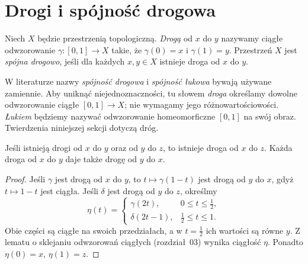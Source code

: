 \section{Drogi i spójność drogowa}
\label{sec:topog-spojnosc-drogi}

\begin{definicja}
\label{def:topog-spojnosc-droga}
Niech $X$ będzie przestrzenią topologiczną.
\emph{Drogą} od $x$ do $y$ nazywamy ciągłe
odwzorowanie $\gamma:[0,1]\to X$ takie,
że $\gamma(0)=x$ i $\gamma(1)=y$.
Przestrzeń $X$ jest \emph{spójna drogowo},
jeśli dla każdych $x,y\in X$ istnieje
droga od $x$ do $y$.
\end{definicja}

\begin{uwaga}
\label{rem:topog-spojnosc-luk}
W literaturze nazwy \emph{spójność drogowa}
i \emph{spójność łukowa} bywają używane
zamiennie. Aby uniknąć niejednoznaczności,
tu słowem \emph{droga} określamy dowolne
odwzorowanie ciągłe $[0,1]\to X$;
nie wymagamy jego różnowartościowości.
\emph{Łukiem} będziemy nazywać odwzorowanie
homeomorficzne $[0,1]$ na swój obraz.
Twierdzenia niniejszej sekcji dotyczą dróg.
\end{uwaga}

\begin{lemat}
\label{lem:topog-spojnosc-skladanie-drog}
Jeśli istnieją drogi od $x$ do $y$ oraz
od $y$ do $z$, to istnieje droga od $x$
do $z$. Każda droga od $x$ do $y$ daje
także drogę od $y$ do $x$.
\end{lemat}
\begin{proof}
Jeśli $\gamma$ jest drogą od $x$ do $y$,
to $t\mapsto\gamma(1-t)$ jest drogą od
$y$ do $x$, gdyż $t\mapsto1-t$ jest ciągła.
Jeśli $\delta$ jest drogą od $y$ do $z$,
określmy
\[
\eta(t)=\begin{cases}
\gamma(2t),&0\le t\le\tfrac12,\\
\delta(2t-1),&\tfrac12\le t\le1.
\end{cases}
\]
Obie części są ciągłe na swoich przedziałach,
a w $t=\tfrac12$ ich wartości są równe $y$.
Z lematu o sklejaniu odwzorowań ciągłych
(rozdział~03) wynika ciągłość $\eta$.
Ponadto $\eta(0)=x$, $\eta(1)=z$.
\end{proof}

